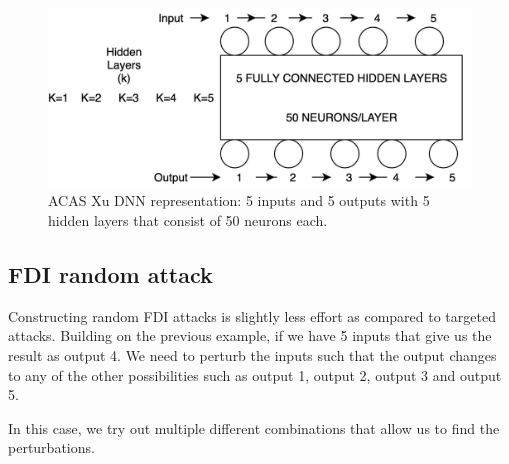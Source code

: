 \begin{figure}
	\centering
	\includegraphics[width=0.7\linewidth]{Images/ACASXuDNN}
	\caption[ACAS Xu DNN]{ACAS Xu DNN representation: 5 inputs and 5 outputs with 5 hidden layers that consist of 50 neurons each.}
	\label{fig:acasxudnn}
\end{figure}

\subsection{FDI random attack} 
Constructing random FDI attacks is slightly less effort as compared to targeted attacks.
Building on the previous example, if we have 5 inputs that give us the result as output 4. We need to perturb the inputs such that the output changes to any of the other possibilities such as output 1, output 2, output 3 and output 5.

In this case, we try out multiple different combinations that allow us to find the perturbations. 